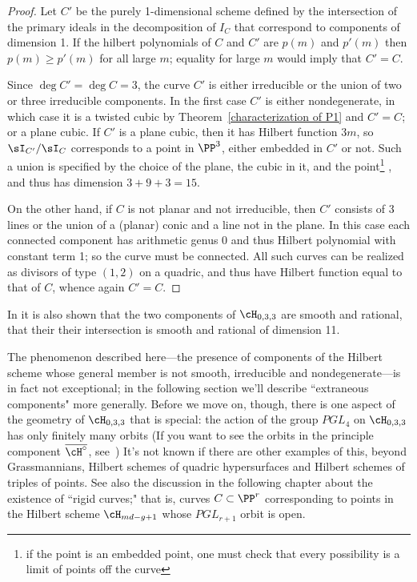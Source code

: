 \begin{proof}
Let $C'$ be the purely 1-dimensional scheme defined by the intersection of the primary ideals in the decomposition of $I_C$ that correspond to
components of dimension 1. If the hilbert polynomials of $C$ and $C'$ are $p(m)$ and  $p'(m)$ then
$p(m) \geq p'(m)$ for all large $m$; equality for large $m$ would imply that $C'=C$.

Since $\deg C' = \deg C = 3$, the curve $C'$ is either irreducible or the union of two or three irreducible components. In the first case $C'$ is either nondegenerate, in which case it is a twisted cubic by Theorem~\ref{characterization of P1} and $C' = C$; or a plane cubic. If $C'$ is a plane cubic, then it has Hilbert function $3m$, so $\sI_{C'}/\sI_C$
corresponds to a point in $\PP^3$, either embedded in $C'$ or not. Such a union is specified by the choice of the
plane, the cubic in it, and the point\footnote{if the point is an embedded point, one must check that every possibility
is a limit of points off the curve} , and thus has dimension $3 + 9+3 = 15.$

On the other hand, if $C$ is not planar and not irreducible, then $C'$ consists of 3 lines or the union of a (planar) conic
and a line not in the plane. In this case each connected component has arithmetic genus 0 and thus Hilbert polynomial
with constant term 1; so the curve must be connected. All such curves can be realized as divisors of type $(1,2)$
on a quadric, and thus have Hilbert function equal to that of $C$, whence again $C' = C$.
\end{proof}

\begin{fact}
In \cite{Piene-Schlessinger} it is also shown that the two components of $\cH_{0,3,3}$ are smooth and rational, that
their their intersection is  smooth and rational of dimension 11.
\end{fact}

The phenomenon described here---the presence of components of the Hilbert scheme whose general member is not smooth, irreducible and nondegenerate---is in fact not exceptional; in the following section we'll describe ``extraneous components" more generally. Before we move on, though, there is one aspect of the geometry of $\cH_{0,3,3}$ that is special: the action of the group $PGL_4$ on $\cH_{0,3,3}$ has only finitely many orbits (If you want to see the orbits in the principle component $\overline{\cH^\circ}$, see~\cite{Montreal}) It's not known if there are other examples of this, beyond Grassmannians, Hilbert schemes of quadric hypersurfaces and Hilbert schemes of triples of points. See also the discussion in the following chapter about the existence of ``rigid curves;" that is, curves $C \subset \PP^r$ corresponding to points in the Hilbert scheme $\cH_{md-g+1}$ whose $PGL_{r+1}$ orbit is open.

